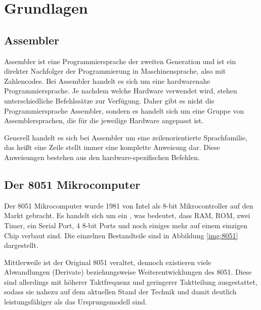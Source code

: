 \chapter{Grundlagen}

\section{Assembler}

Assembler ist eine Programmiersprache der zweiten Generation und ist ein direkter Nachfolger der Programmierung in Maschinensprache, also mit Zahlencodes. Bei Assembler handelt es sich um eine hardwarenahe Programmiersprache. Je nachdem welche Hardware verwendet wird, stehen unterschiedliche Befehlssätze zur Verfügung. Daher gibt es nicht die  Programmiersprache Assembler, sondern es handelt sich um eine Gruppe von Assemblersprachen, die für die jeweilige Hardware angepasst ist.\cite{bib:assembler}

Generell handelt es sich bei Assembler um eine zeilenorientierte Sprachfamilie, das heißt eine Zeile stellt immer eine komplette Anweisung dar. Diese Anweisungen bestehen aus den hardware-spezifischen Befehlen.\cite{bib:assembler_book}

\section{Der 8051 Mikrocomputer} \label{section:8051}

Der 8051 Mikrocomputer wurde 1981 von Intel als 8-bit Mikrocontroller auf den Markt gebracht. Es handelt sich um ein , was bedeutet, dass RAM, ROM, zwei Timer, ein Serial Port, 4 8-bit Ports und noch einiges mehr auf einem einzigen Chip verbaut sind. Die einzelnen Bestandteile sind in Abbildung \ref{img:8051} dargestellt.\cite{bib:8051} 

Mittlerweile ist der Original 8051 veraltet, dennoch existieren viele Abwandlungen (Derivate) beziehungsweise Weiterentwicklungen des 8051. Diese sind allerdings mit höherer Taktfrequenz und geringerer Taktteilung ausgestattet, sodass sie nahezu auf dem aktuellen Stand der Technik und damit deutlich leistungsfähiger als das Ursprungsmodell sind.\cite{bib:8051_2}

